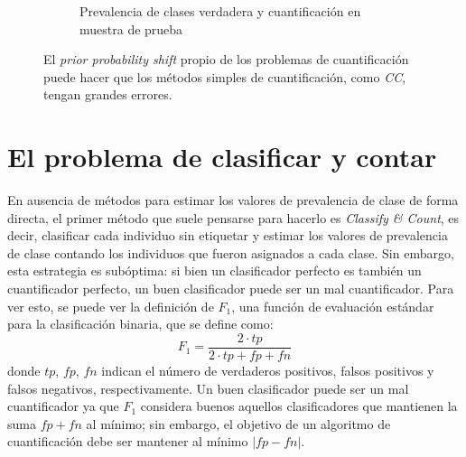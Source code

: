 \begin{figure}[h]
\begin{subfigure}[t]{0.4\textwidth}
        \caption{Prevalencia de clases verdadera y cuantificación en muestra de
        prueba}\label{cambios:cuantificacion_tst}
    \end{subfigure}
    \caption{El {\it prior probability shift\/} propio de los problemas de
    cuantificación puede hacer que los métodos simples de cuantificación, como
    {\it CC}, tengan grandes errores.}\label{fig:cambios}
\end{figure}

\section{El problema de clasificar y contar}\label{problema:clasificar_y_contar}

En ausencia de métodos para estimar los valores de prevalencia de clase de forma
directa, el primer método que suele pensarse para hacerlo es {\it Classify \&
Count}, es decir, clasificar cada individuo sin etiquetar y estimar los valores
de prevalencia de clase contando los individuos que fueron asignados a cada
clase. Sin embargo, esta estrategia es subóptima: si bien un clasificador
perfecto es también un cuantificador perfecto, un buen clasificador puede ser un
mal cuantificador. Para ver esto, se puede ver la definición de $F_1$, una
función de evaluación estándar para la clasificación binaria, que se define
como:
\begin{equation}
    F_1 = \frac{2 \cdot tp}{2 \cdot tp + fp + fn}
\end{equation}
donde $tp$, $fp$, $fn$ indican el número de verdaderos positivos, falsos
positivos y falsos negativos, respectivamente. Un buen clasificador puede ser un
mal cuantificador ya que $F_1$ considera buenos aquellos clasificadores que
mantienen la suma $fp + fn$ al mínimo; sin embargo, el objetivo de un algoritmo
de cuantificación debe ser mantener al mínimo $|fp-fn|$.

